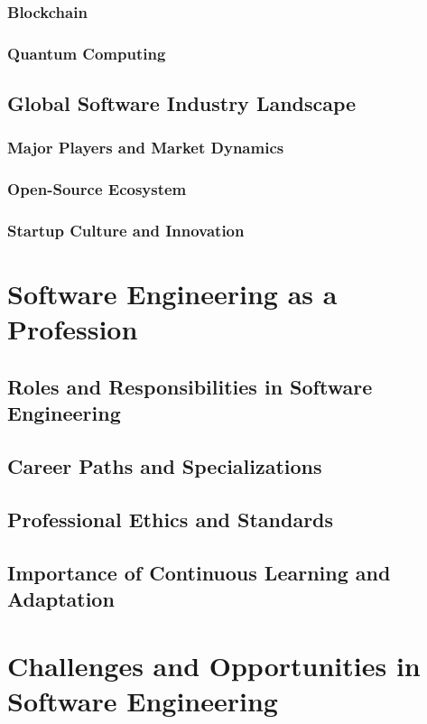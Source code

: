 \begin{refsection}
\subsubsection{Blockchain}
\subsubsection{Quantum Computing}
\subsection{Global Software Industry Landscape}
\subsubsection{Major Players and Market Dynamics}
\subsubsection{Open-Source Ecosystem}
\subsubsection{Startup Culture and Innovation}

\newpage

\section{Software Engineering as a Profession}
\subsection{Roles and Responsibilities in Software Engineering}
\subsection{Career Paths and Specializations}
\subsection{Professional Ethics and Standards}
\subsection{Importance of Continuous Learning and Adaptation}

\newpage

\section{Challenges and Opportunities in Software Engineering}

\end{refsection}
